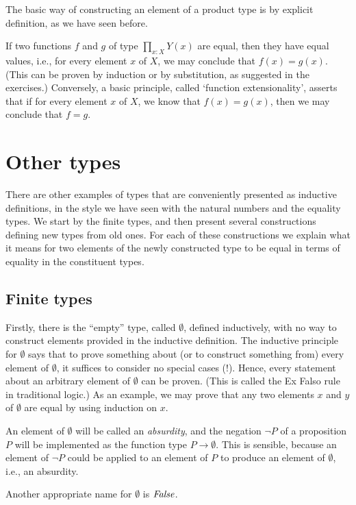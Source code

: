 The basic way of constructing an element of a product type
is by explicit definition, as we have seen before.

If two functions $f$ and $g$ of type $\prod_{x:X} Y(x)$ are equal, 
then they have equal values, i.e., for every element $x$ of $X$, 
we may conclude that $f(x) = g(x)$.
(This can be proven by induction or by substitution, as suggested in the exercises.)
Conversely, a basic principle, called `function extensionality', 
asserts that if for every element $x$ of $X$, 
we know that $f(x) = g(x)$, then we may conclude that $f=g$.

\section{Other types}
\label{sec:other-types}

There are other examples of types that are conveniently presented as 
inductive definitions, in the style we have seen with the natural numbers
and the equality types.  We start by the finite types, and then
present several constructions defining new types from old ones.
For each of these constructions we explain what it means for two 
elements of the newly constructed type to be equal in terms of
equality in the constituent types.

\subsection{Finite types}
\label{sec:finite-types}
Firstly, there is the ``empty'' type, called $\emptyset$, defined inductively, with no way to construct elements provided in the inductive
definition.  The inductive principle for $\emptyset$ says that to prove something about (or to construct something from) every element of
$\emptyset$, it suffices to consider no special cases (!).  Hence, every statement about an arbitrary element of $\emptyset$ can be proven. (This is called the Ex Falso
rule in traditional logic.) As
an example, we may prove that any two elements $x$ and $y$ of $\emptyset$ are equal by using induction on $x$.

An element of $\emptyset$ will be called an \emph{absurdity}, and the negation $\neg P$ of a proposition $P$ will be implemented as the function
type $P \to \emptyset$.  This is sensible, because an element of $\neg P$ could be applied to an element of $P$ to produce an element of
$\emptyset$, i.e., an absurdity.

Another appropriate name for $\emptyset$ is $\mathop{\mathit{False}}$.

